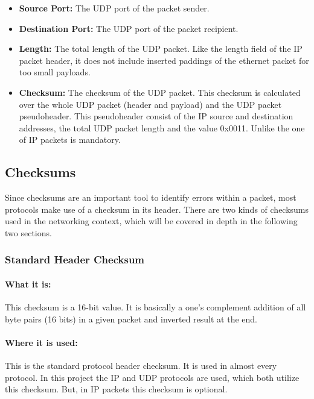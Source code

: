 \begin{itemize}
  \item \textbf{Source Port:} The UDP port of the packet sender.
  \item \textbf{Destination Port:} The UDP port of the packet recipient.
  \item \textbf{Length:} The total length of the UDP packet. Like the length field of the IP packet header, it does not include inserted paddings of the ethernet packet for too small payloads.
  \item \textbf{Checksum:} The checksum of the UDP packet. This checksum is calculated over the whole UDP packet (header and payload) and the UDP packet pseudoheader. This pseudoheader consist of the IP source and destination addresses, the total UDP packet length and the value 0x0011. Unlike the one of IP packets is mandatory.
\end{itemize}

\subsection{Checksums}
Since checksums are an important tool to identify errors within a packet, most protocols make use of a checksum in its header. There are two kinds of checksums used in the networking context, which will be covered in depth in the following two sections.

\subsubsection{Standard Header Checksum}\label{section:basic_checksum}

\paragraph{What it is:}
This checksum is a 16-bit value. It is basically a one's complement addition of all byte pairs (16 bits) in a given packet and inverted result at the end.

\paragraph{Where it is used:}
This is the standard protocol header checksum. It is used in almost every protocol. In this project the IP and UDP protocols are used, which both utilize this checksum. But, in IP packets this checksum is optional.

